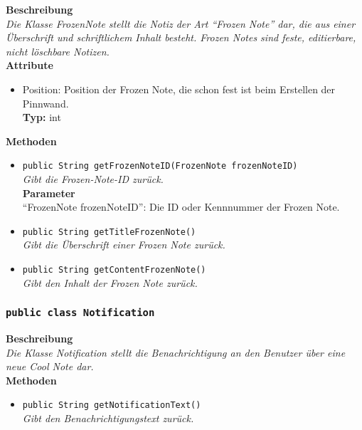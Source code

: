 	\textbf{Beschreibung} \\
	\textit{Die Klasse FrozenNote stellt die Notiz der Art “Frozen Note” dar, die aus einer Überschrift und schriftlichem Inhalt besteht. Frozen Notes sind feste, editierbare, nicht löschbare Notizen.} \\
	
	\textbf{Attribute}
	\begin{itemize}
		\item Position: Position der Frozen Note, die schon fest ist beim Erstellen der Pinnwand.\\
		\textbf{Typ:} int
	\end{itemize}
	
	\textbf{Methoden}
	\begin{itemize}
		\item\texttt{{public String getFrozenNoteID(FrozenNote frozenNoteID)}}\\
		\textit{Gibt die Frozen-Note-ID zurück.}\\
		\textbf{Parameter}\\
		“FrozenNote frozenNoteID”: Die ID oder Kennnummer der Frozen Note.\\
		
		\item\texttt{{public String getTitleFrozenNote()}}\\
		\textit{Gibt die Überschrift einer Frozen Note zurück.}\\
		
		\item\texttt{{public String getContentFrozenNote()}}\\
		\textit{Gibt den Inhalt der Frozen Note zurück.}\\
	\end{itemize}

\subsubsection{\texttt{public class Notification}}

	\textbf{Beschreibung} \\
	\textit{Die Klasse Notification stellt die Benachrichtigung an den Benutzer über eine neue Cool Note dar.} \\
	
	\textbf{Methoden}
	\begin{itemize}
		\item\texttt{{public String getNotificationText()}}\\
		\textit{Gibt den Benachrichtigungstext zurück.}\\
	\end{itemize}

